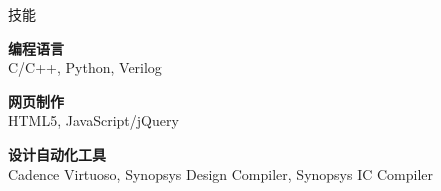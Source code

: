 
\begin{rSection}{技能}

{\bf 编程语言} \\
C/C++, Python, Verilog 

{\bf 网页制作} \\
HTML5, JavaScript/jQuery 

{\bf 设计自动化工具} \\
Cadence Virtuoso, Synopsys Design Compiler, Synopsys IC Compiler 

\end{rSection}
